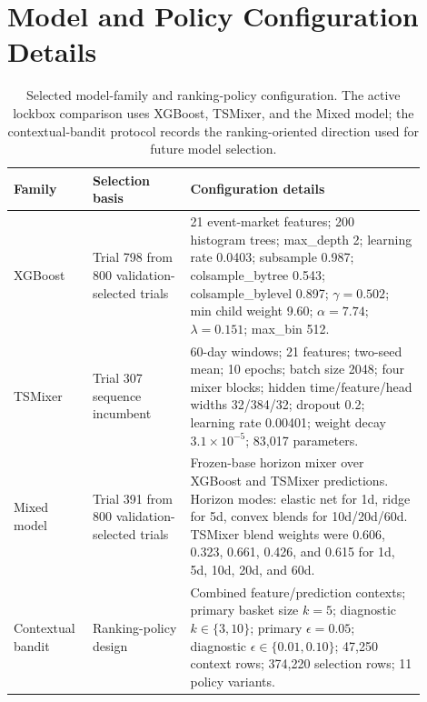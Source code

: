 \documentclass[sigconf,nonacm]{acmart}
\begin{document}
\section{Model and Policy Configuration Details}
\begin{table}[H]
\centering
\scriptsize
\caption{Selected model-family and ranking-policy configuration. The active lockbox comparison uses XGBoost, TSMixer, and the Mixed model; the contextual-bandit protocol records the ranking-oriented direction used for future model selection.}
\begin{tabular}{@{}p{0.15\linewidth}p{0.22\linewidth}p{0.53\linewidth}@{}}
\toprule
Family & Selection basis & Configuration details \\
\midrule
XGBoost & Trial 798 from 800 validation-selected trials & 21 event-market features; 200 histogram trees; max\_depth 2; learning rate 0.0403; subsample 0.987; colsample\_bytree 0.543; colsample\_bylevel 0.897; $\gamma=0.502$; min child weight 9.60; $\alpha=7.74$; $\lambda=0.151$; max\_bin 512. \\
TSMixer & Trial 307 sequence incumbent & 60-day windows; 21 features; two-seed mean; 10 epochs; batch size 2048; four mixer blocks; hidden time/feature/head widths 32/384/32; dropout 0.2; learning rate 0.00401; weight decay $3.1\times10^{-5}$; 83,017 parameters. \\
Mixed model & Trial 391 from 800 validation-selected trials & Frozen-base horizon mixer over XGBoost and TSMixer predictions. Horizon modes: elastic net for 1d, ridge for 5d, convex blends for 10d/20d/60d. TSMixer blend weights were 0.606, 0.323, 0.661, 0.426, and 0.615 for 1d, 5d, 10d, 20d, and 60d. \\
Contextual bandit & Ranking-policy design & Combined feature/prediction contexts; primary basket size $k=5$; diagnostic $k\in\{3,10\}$; primary $\epsilon=0.05$; diagnostic $\epsilon\in\{0.01,0.10\}$; 47,250 context rows; 374,220 selection rows; 11 policy variants. \\
\bottomrule
\end{tabular}
\label{tab:model_config_details}
\end{table}
\end{document}
